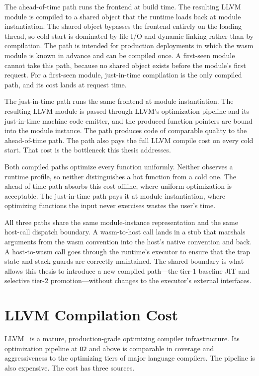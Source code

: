 The ahead-of-time path runs the frontend at build time. The resulting LLVM module is compiled to a shared object that the runtime loads back at module instantiation. The shared object bypasses the frontend entirely on the loading thread, so cold start is dominated by file I/O and dynamic linking rather than by compilation. The path is intended for production deployments in which the wasm module is known in advance and can be compiled once. A first-seen module cannot take this path, because no shared object exists before the module's first request. For a first-seen module, just-in-time compilation is the only compiled path, and its cost lands at request time.

The just-in-time path runs the same frontend at module instantiation. The resulting LLVM module is passed through LLVM's optimization pipeline and its just-in-time machine code emitter, and the produced function pointers are bound into the module instance. The path produces code of comparable quality to the ahead-of-time path. The path also pays the full LLVM compile cost on every cold start. That cost is the bottleneck this thesis addresses.

Both compiled paths optimize every function uniformly. Neither observes a runtime profile, so neither distinguishes a hot function from a cold one. The ahead-of-time path absorbs this cost offline, where uniform optimization is acceptable. The just-in-time path pays it at module instantiation, where optimizing functions the input never exercises wastes the user's time.

All three paths share the same module-instance representation and the same host-call dispatch boundary. A wasm-to-host call lands in a stub that marshals arguments from the wasm convention into the host's native convention and back. A host-to-wasm call goes through the runtime's executor to ensure that the trap state and stack guards are correctly maintained. The shared boundary is what allows this thesis to introduce a new compiled path---the tier-1 baseline JIT and selective tier-2 promotion---without changes to the executor's external interfaces.

\section{LLVM Compilation Cost}
\label{sec:bg:llvm-cost}

LLVM~\cite{lattner2004llvm} is a mature, production-grade optimizing compiler infrastructure. Its optimization pipeline at \texttt{O2} and above is comparable in coverage and aggressiveness to the optimizing tiers of major language compilers. The pipeline is also expensive. The cost has three sources.

